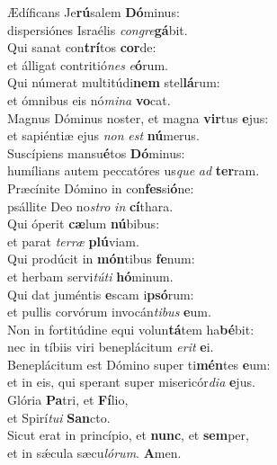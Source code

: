 \evenverse Ædíficans Je\textbf{rú}salem \textbf{Dó}minus:~\*\\
\evenverse dispersiónes Israélis \textit{con}\textit{gre}\textbf{gá}bit.\\
\oddverse Qui sanat con\textbf{trí}tos \textbf{cor}de:~\*\\
\oddverse et álligat contritió\textit{nes} \textit{e}\textbf{ó}rum.\\
\evenverse Qui númerat multitúdi\textbf{nem} stel\textbf{lá}rum:~\*\\
\evenverse et ómnibus eis nó\textit{mi}\textit{na} \textbf{vo}cat.\\
\oddverse Magnus Dóminus noster, et magna \textbf{vir}tus \textbf{e}jus:~\*\\
\oddverse et sapiéntiæ ejus \textit{non} \textit{est} \textbf{nú}merus.\\
\evenverse Suscípiens mansu\textbf{é}tos \textbf{Dó}minus:~\*\\
\evenverse humílians autem peccatóres us\textit{que} \textit{ad} \textbf{ter}ram.\\
\oddverse Præcínite Dómino in con\textbf{fes}si\textbf{ó}ne:~\*\\
\oddverse psállite Deo no\textit{stro} \textit{in} \textbf{cí}thara.\\
\evenverse Qui óperit \textbf{cæ}lum \textbf{nú}bibus:~\*\\
\evenverse et parat \textit{ter}\textit{ræ} \textbf{plú}viam.\\
\oddverse Qui prodúcit in \textbf{món}tibus \textbf{fe}num:~\*\\
\oddverse et herbam servi\textit{tú}\textit{ti} \textbf{hó}minum.\\
\evenverse Qui dat juméntis \textbf{e}scam i\textbf{psó}rum:~\*\\
\evenverse et pullis corvórum invocán\textit{ti}\textit{bus} \textbf{e}um.\\
\oddverse Non in fortitúdine equi volun\textbf{tá}tem ha\textbf{bé}bit:~\*\\
\oddverse nec in tíbiis viri beneplácitum \textit{e}\textit{rit} \textbf{e}i.\\
\evenverse Beneplácitum est Dómino super ti\textbf{mén}tes \textbf{e}um:~\*\\
\evenverse et in eis, qui sperant super misericór\textit{di}\textit{a} \textbf{e}jus.\\
\oddverse Glória \textbf{Pa}tri, et \textbf{Fí}lio,~\*\\
\oddverse et Spirí\textit{tu}\textit{i} \textbf{San}cto.\\
\evenverse Sicut erat in princípio, et \textbf{nunc}, et \textbf{sem}per,~\*\\
\evenverse et in sǽcula sæcu\textit{ló}\textit{rum}. \textbf{A}men.\\
